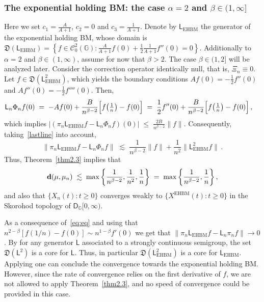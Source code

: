 \documentclass[12pt,a4paper]{article}
\theoremstyle{plain}
\theoremstyle{remark}
\newcommand{\msf}[1]{{\mathsf #1}}
\newcommand{\mc}[1]{{\mathcal #1}}
\newcommand{\mf}[1]{{\mathfrak #1}}
\newcommand{\bb}[1]{{\mathbb #1}}
\newcommand{\norm}[1]{\lVert#1\rVert}
\newcommand{\pfrac}[2]{\genfrac{}{}{}{1}{#1}{#2}}
\newcommand{\pn}[1]{\big(\pfrac{#1}{n}\big)}
\begin{document}
	
	\subsubsection{The exponential holding BM: the case  \texorpdfstring{$\alpha = 2$}{alpha = 2} and  \texorpdfstring{$\beta \in (1, \infty]$}{beta in (1, infty]}}
	Here we set
	$c_1 = \frac{A}{A + 1}$, $c_2 = 0$ and $c_3 = \frac{1}{A + 1}$.
	Denote by $\msf{L}_\text{EHBM}$ the generator of the exponential holding BM, whose domain is  $\mf{D}\left(\msf{L}_\text{EHBM}\right) = \left\{f \in \mc{C}_0^2(\bb{G}):\frac{A}{A + 1}f(0) + \frac{1}{2}\frac{1}{A + 1}f''(0) = 0\right\}$.
	Additionally to $\alpha = 2$ and $\beta \in (1, \infty)$, assume for now that $\beta>2$. The case $\beta \in(1,2]$ will be analyzed later.
	Consider the correction operator identically null, that is, $\Xi_n \equiv 0$. Let $f \in \mf{D}(\msf{L}^2_\text{EHBM})$, which  yields the boundary conditions $Af(0) = -\frac{1}{2}f''(0)$ and $Af''(0) = -\frac{1}{2}f''''(0)$. Then,
	\begin{equation}\label{eq:eq}
		\begin{split}
			\msf{L}_n\Phi_nf(0) & \;=\; - Af(0) + \frac{B}{n^{\beta - 2}}\Big[f\pn{1} - f(0)\Big] \;=\; \frac{1}{2}f''(0) + \frac{B}{n^{\beta - 2}}\Big[f\pn{1} - f(0)\Big]\,,
		\end{split}
	\end{equation}
	which implies $\left|\left(\pi_n\msf{L}_\text{EHBM}f - \msf{L}_n\Phi_nf\right)(0)\right|\; \leq\; \frac{2B}{n^{\beta - 2}}\norm{f}$.
	Consequently, taking~\eqref{lastline} into account,
	\begin{equation}\label{EHBM2}
		\norm{\pi_n\msf{L}_\text{EHBM}f - \msf{L}_n\Phi_nf}\;\lesssim\; \frac{1}{n^{\beta - 2}}\norm{f} + \frac{1}{n^2}\norm{\msf{L}_\text{EHBM}^2f}\,.
	\end{equation}
	Thus, Theorem~\ref{thm2.3} implies that
	\begin{equation*}
		{\bf d}(\mu, \mu_n) \;\lesssim\; \max\left\{\frac{1}{n^{\beta - 2}}, \frac{1}{n^2},\frac{1}{n}\right\}\;=\; \max\left\{\frac{1}{n^{\beta - 2}}, \frac{1}{n}\right\},
	\end{equation*}
	and also that $\{X_{n}(t): t\geq 0\}$ converges weakly to $\{X^\text{EHBM}(t):t \geq 0\}$ in the Skorohod topology of $\msf{D}_{\bb{G}}[0, \infty)$.\medskip
	
	
	As a consequence of~\eqref{eq:eq} and using that 
	$ n^{2-\beta}[f(1/n) - f(0)]\sim n^{1-\beta}f'(0)$	we get that\break
	$\norm{\pi_n \msf{L}_{\text{EHBM}} f-\msf{L}_n \pi_n f}\to 0$. By \citet[Proposition 1.8, page 53]{engel2000one} for any generator $\msf{L}$ associated to a strongly continuous semigroup, the set $\mf{D}(\msf{L}^2)$ is a core for $\msf{L}$. Thus, in particular $\mf{D}(\msf{L}_{\text{EHBM}}^2)$ is a core for $\msf{L}_{\text{EHBM}}$. Applying 
	\citet[Theorem~6.1, page~28 and Theorem~2.11, page~172]{EK} one can conclude the convergence towards the exponential holding BM. However, since the rate of convergence relies on the first derivative of $f$, we are not allowed to apply Theorem~\ref{thm2.3}, and no speed of convergence could be provided in this case.
	
\end{document}
